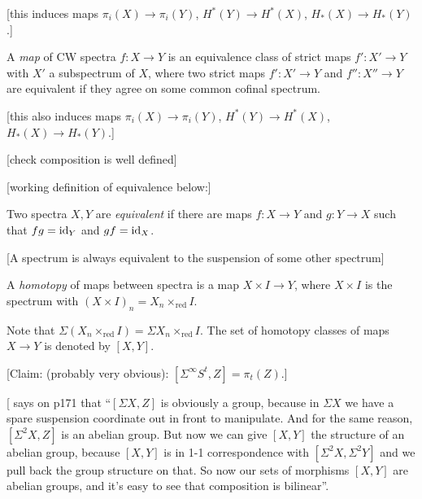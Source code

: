 \documentclass{MetricNotes2023}
\def\id{\ensuremath\text{id}}
\begin{document}
[this induces maps \(\pi_i(X)\to\pi_i(Y)\), \(H^*(Y)\to H^*(X)\), \(H_*(X)\to H_*(Y)\).]

\begin{definition}
A \textit{map} of CW spectra \(f : X \to Y\) is an equivalence class of strict maps \(f' : X' \to Y\) with \(X'\) a subspectrum of \(X\), where two strict maps \(f' : X' \to Y\) and \(f'' : X'' \to Y\) are equivalent if they agree on some common cofinal spectrum. 
\end{definition}

[this also induces maps \(\pi_i(X)\to\pi_i(Y)\), \(H^*(Y)\to H^*(X)\), \(H_*(X)\to H_*(Y)\).]

[check composition is well defined]

[working definition of equivalence below:]

\begin{definition}
Two spectra \(X, Y\) are \textit{equivalent} if there are maps \(f : X \to Y\) and \(g : Y \to X\) such that \(fg=\id_{Y}\) and \(gf=\id_X\).
\end{definition}

[A spectrum is always equivalent to the suspension of some other spectrum]


\begin{definition}
A \textit{homotopy} of maps between spectra is a map \(X\times I \to Y\), where \(X\times I\) is the spectrum with \((X\times I)_n=X_n\times_{\text{red}} I\).
\end{definition}

Note that \(\Sigma(X_n\times_{\text{red}}I)=\Sigma X_n\times_{\text{red}}I\). The set of homotopy classes of maps \(X\to Y\) is denoted by \([X,Y]\). 

[Claim: (probably very obvious): \([\Sigma^\infty S^t, Z]=\pi_t(Z)\).]

[\autocite{stable_homotopy} says on p171 that ``\([\Sigma X, Z]\) is obviously a group, because in \(\Sigma X\) we have a spare suspension coordinate out in front to manipulate. And for the same reason, \([\Sigma^2 X, Z]\) is an abelian group. But now we can give \([X,Y]\) the structure of an abelian group, because \([X,Y]\) is in 1-1 correspondence with \([\Sigma^2X, \Sigma^2 Y]\) and we pull back the group structure on that. So now our sets of morphisms \([X,Y]\) are abelian groups, and it's easy to see that composition is bilinear''. 
\end{document}
